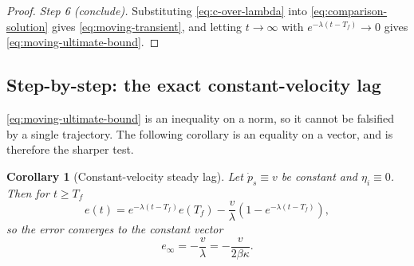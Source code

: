 \documentclass[11pt,a4paper]{article}
\theoremstyle{plain}
\newtheorem{corollary}{Corollary}
\theoremstyle{definition}
\begin{document}
\begin{proof}
\emph{Step 6 (conclude).} Substituting \eqref{eq:c-over-lambda} into
\eqref{eq:comparison-solution} gives \eqref{eq:moving-transient}, and letting $t\to\infty$ with
$e^{-\lambda(t-T_f)}\to0$ gives \eqref{eq:moving-ultimate-bound}.
\end{proof}

\subsection{Step-by-step: the exact constant-velocity lag}\label{sec:gap2-lag}

\eqref{eq:moving-ultimate-bound} is an inequality on a norm, so it cannot be falsified by a
single trajectory. The following corollary is an equality on a vector, and is therefore the
sharper test.

\begin{corollary}[Constant-velocity steady lag]\label{cor:constant-velocity}
Let $\dot p_s\equiv v$ be constant and $\eta_i\equiv0$. Then for $t\geq T_f$
\begin{equation}\label{eq:constant-velocity-solution}
    e(t)=e^{-\lambda(t-T_f)}e(T_f)
    -\frac{v}{\lambda}\left(1-e^{-\lambda(t-T_f)}\right),
\end{equation}
so the error converges to the constant vector
\begin{equation}\label{eq:constant-velocity-lag}
    e_\infty=-\frac{v}{\lambda}=-\frac{v}{2\beta\kappa}.
\end{equation}
\end{corollary}
\end{document}
